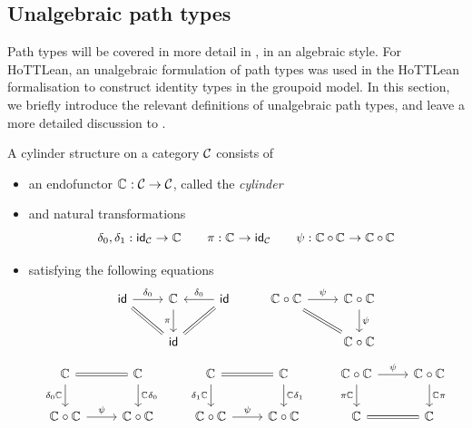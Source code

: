\subsection*{Unalgebraic path types}

Path types will be covered in more detail in ,
in an algebraic style.
For HoTTLean, an unalgebraic formulation of path types
was used in the HoTTLean formalisation
to construct identity types in the groupoid model.
In this section, we briefly introduce the relevant definitions
of unalgebraic path types,
and leave a more detailed discussion to .

\begin{definition}
  \label{def:cylinder-structure}
  A cylinder structure on a category $\mathcal{C}$
  consists of
  \begin{itemize}
    \item an endofunctor ${\mathop{\mathbb{C}_{}}} : \mathcal{C} \to \mathcal{C}$, called the \emph{cylinder}
    \item and natural transformations
      \[\delta_0, \delta_1 : \mathsf{id}_{\mathcal{C}} \to {\mathop{\mathbb{C}_{}}}
      \quad \quad
      \pi : {\mathop{\mathbb{C}_{}}} \to \mathsf{id}_{\mathcal{C}}
      \quad \quad 
      \psi : \mathop{\mathbb{C}_{}} \circ \mathop{\mathbb{C}_{}} \to \mathop{\mathbb{C}_{}} \circ \mathop{\mathbb{C}_{}}\]
    \item satisfying the following equations
    \[
    \begin{tikzcd}
      \id & {\cyl} & \id & {{\cyl} \circ {\cyl}} & {{\cyl} \circ {\cyl}} \\
      & \id &&& {{\cyl} \circ {\cyl}}
      \arrow["{\delta_0}", from=1-1, to=1-2]
      \arrow[equals, from=1-1, to=2-2]
      \arrow["\pi"', from=1-2, to=2-2]
      \arrow["{\delta_0}"', from=1-3, to=1-2]
      \arrow[equals, from=1-3, to=2-2]
      \arrow["\psi", from=1-4, to=1-5]
      \arrow[equals, from=1-4, to=2-5]
      \arrow["\psi", from=1-5, to=2-5]
    \end{tikzcd}
    \]
    \[ \begin{tikzcd}
      {\cyl} & {\cyl} & {\cyl} & {\cyl} & {{\cyl} \circ {\cyl}} & {{\cyl} \circ {\cyl}} \\
        {{\cyl} \circ {\cyl}} & {{\cyl} \circ {\cyl}} & {{\cyl} \circ {\cyl}} & {{\cyl} \circ {\cyl}} & {\cyl} & {\cyl}
        \arrow[equals, from=1-1, to=1-2]
        \arrow["{\delta_0 {\cyl}}"', from=1-1, to=2-1]
        \arrow["{{\cyl} \delta_0}", from=1-2, to=2-2]
        \arrow[equals, from=1-3, to=1-4]
        \arrow["{\delta_1 {\cyl}}"', from=1-3, to=2-3]
        \arrow["{{\cyl} \delta_1}", from=1-4, to=2-4]
        \arrow["\psi", from=1-5, to=1-6]
        \arrow["{\pi {\cyl}}"', from=1-5, to=2-5]
        \arrow["{{\cyl} \pi}", from=1-6, to=2-6]
        \arrow["\psi", from=2-1, to=2-2]
        \arrow["\psi", from=2-3, to=2-4]
        \arrow[equals, from=2-5, to=2-6]
      \end{tikzcd}\]
  \end{itemize}
\end{definition}

